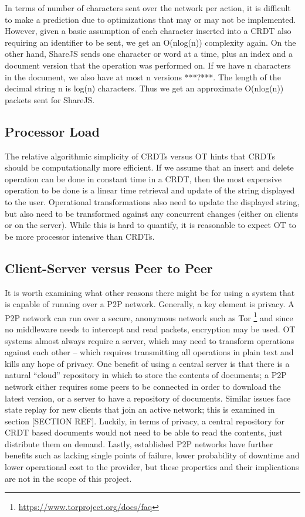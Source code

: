 \documentclass[12pt,a4paper,twoside,openright]{report}
\begin{document}
	In terms of number of characters sent over the network per action, it is difficult to make a prediction due to optimizations that may or may not be implemented. However, given a basic assumption of each character inserted into a CRDT also requiring an identifier to be sent, we get an O(nlog(n)) complexity again. On the other hand, ShareJS sends one character or word at a time, plus an index and a document version that the operation was performed on. If we have n characters in the document, we also have at most n versions ***?***. The length of the decimal string n is log(n) characters. Thus we get an approximate O(nlog(n)) packets sent for ShareJS.
	
	\subsection{Processor Load}
	
	The relative algorithmic simplicity of CRDTs versus OT hints that CRDTs should be computationally more efficient. If we assume that an insert and delete operation can be done in constant time in a CRDT, then the most expensive operation to be done is a linear time retrieval and update of the string displayed to the user. Operational transformations also need to update the displayed string, but also need to be transformed against any concurrent changes (either on clients or on the server). While this is hard to quantify, it is reasonable to expect OT to be more processor intensive than CRDTs.
	
	
	\subsection{Client-Server versus Peer to Peer}
	
	It is worth examining what other reasons there might be for using a system that is capable of running over a P2P network. Generally, a key element is privacy. A P2P network can run over a secure, anonymous network such as Tor \footnote{\url{https://www.torproject.org/docs/faq}} and since no middleware needs to intercept and read packets, encryption may be used. OT systems almost always require a server, which may need to transform operations against each other – which requires transmitting all operations in plain text and kills any hope of privacy. One benefit of using a central server is that there is a natural “cloud” repository in which to store the contents of documents; a P2P network either requires some peers to be connected in order to download the latest version, or a server to have a repository of documents. Similar issues face state replay for new clients that join an active network; this is examined in section [SECTION REF]. Luckily, in terms of privacy, a central repository for CRDT based documents would not need to be able to read the contents, just distribute them on demand. Lastly, established P2P networks have further benefits such as lacking single points of failure, lower probability of downtime and lower operational cost to the provider, but these properties and their implications are not in the scope of this project.
	
\end{document}
